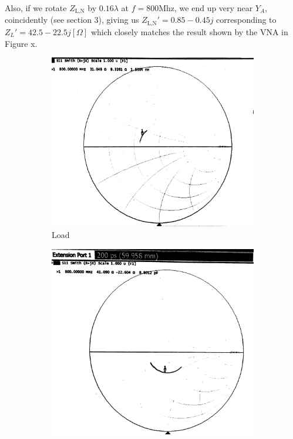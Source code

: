 \documentclass[10pt]{article}
\begin{document}
Also, if we rotate $Z_\text{L,N}$ by $0.16\lambda$ at $f=800\text{Mhz}$, we end up very near $Y_A$, coincidently (see section 3), 
giving us $Z_\text{L,N}' = 0.85 - 0.45j$ corresponding to $Z_L' = 42.5 - 22.5j [\Omega]$ which closely matches 
the result shown by the VNA in Figure x. 


\begin{figure}[ht]
  \centering
  \begin{subfigure}[b]{0.45\textwidth}
      \includegraphics[width=\textwidth]{../photos/lab3/load_as_is.jpg}
      \caption{Load }
  \end{subfigure}
  \quad
  \begin{subfigure}[b]{0.45\textwidth}
    \includegraphics[width=\textwidth]{../photos/lab3/load_deembedded.jpg}

\end{subfigure}
\end{figure}
\end{document}
